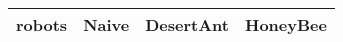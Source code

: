 \begin{tabular} {|l|l|l|l|}
\hline
robots & Naive & DesertAnt & HoneyBee \\
\hline
\hline
\end{tabular}
